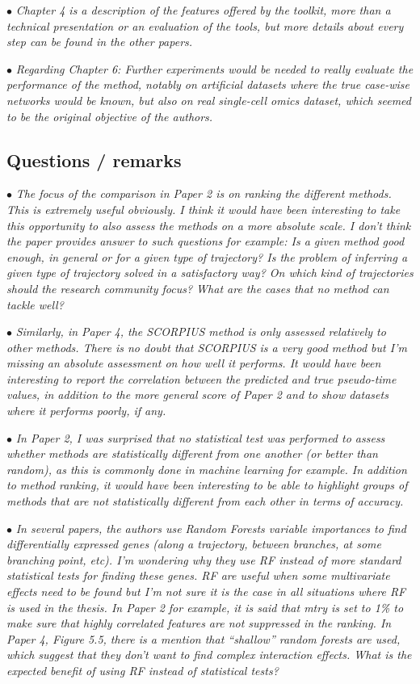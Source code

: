 \documentclass[10pt]{article}
\newcommand{\exam}[2][\  ]{\hspace{0pt}\marginpar{\color{red}#1}$\bullet$ \textit{#2}}
\newcommand{\imp}[1]{{\color{red} #1}}
\newcommand{\bigexclaim}{\raisebox{-0.1em}{\BigTriangleUp}\hspace{-0.32em}\llap{\small\textbf{!}}\hspace{0.32em}}
\newcommand{\tagimp}{\bigexclaim}
\begin{document}
{{\exam{Chapter 4 is a description of the features offered by the toolkit, more than a technical presentation
	or an evaluation of the tools, but more details about every step can be found in the other papers.}

\exam{Regarding Chapter 6: Further experiments
	would be needed to really evaluate the performance of the method, notably on artificial datasets
	where the true case-wise networks would be known, but also on real single-cell omics dataset,
	which seemed to be the original objective of the authors.}

\subsection{Questions / remarks} 

\exam[\tagimp]{The focus of the comparison in Paper 2 is on ranking the different methods. This is extremely
	useful obviously. \imp{I think it would have been interesting to take this opportunity to also assess
	the methods on a more absolute scale.} I don’t think the paper provides answer to such
	questions for example: Is a given method good enough, in general or for a given type of
	trajectory? Is the problem of inferring a given type of trajectory solved in a satisfactory way?
	On which kind of trajectories should the research community focus? What are the cases that
	no method can tackle well?}

\exam{Similarly, in Paper 4, the SCORPIUS method is only assessed relatively to other methods.
	There is no doubt that SCORPIUS is a very good method but I’m missing an absolute
	assessment on how well it performs. It would have been interesting to report the correlation
	between the predicted and true pseudo-time values, in addition to the more general score of
	Paper 2 and to show datasets where it performs poorly, if any.}

\exam[\tagimp]{\imp{In Paper 2, I was surprised that no statistical test was performed to assess whether methods
	are statistically different from one another} (or better than random), as this is commonly done
	in machine learning for example. In addition to method ranking, it would have been
	interesting to be able to highlight groups of methods that are not statistically different from
	each other in terms of accuracy.}

\exam[\tagimp]{In several papers, the authors use Random Forests variable importances to find differentially
	expressed genes (along a trajectory, between branches, at some branching point, etc). \imp{I’m
	wondering why they use RF instead of more standard statistical tests for finding these genes.}
	RF are useful when some multivariate effects need to be found but I’m not sure it is the case
	in all situations where RF is used in the thesis. In Paper 2 for example, it is said that mtry is
	set to 1\% to make sure that highly correlated features are not suppressed in the ranking. In
	Paper 4, Figure 5.5, there is a mention that “shallow” random forests are used, which suggest
	that they don’t want to find complex interaction effects. What is the expected benefit of
	using RF instead of statistical tests?}

}}
\end{document}
